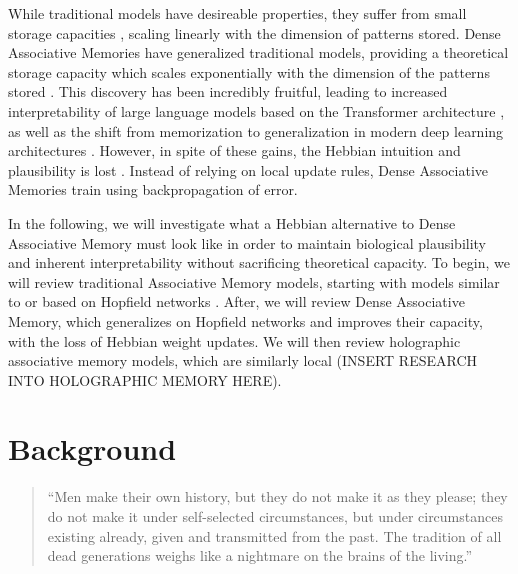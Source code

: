 \documentclass{article}
\theoremstyle{definition}
\begin{document}
While traditional models have desireable properties, they suffer from small
storage capacities \parencites{hopfield_neural_1982,amit_storing_1985},
scaling linearly with the dimension of patterns stored. Dense
Associative Memories have generalized traditional models, providing a
theoretical
storage capacity which scales exponentially with the dimension of the patterns
stored \parencites{krotov_dense_2016,demircigil_model_2017}. This discovery
has been incredibly fruitful, leading to increased interpretability of
large language models based on the Transformer architecture
\parencites{vaswani_attention_2023,ramsauer_hopfield_2021}, as well as the shift
from memorization to generalization in modern deep learning architectures
\parencite{pham_memorization_2025}. However, in spite of these gains,
the Hebbian
intuition and plausibility is lost \parencite{mcalister_sequential_2025}.
Instead of relying on local update rules, Dense Associative Memories
train using backpropagation of error.

In the following, we will investigate what a Hebbian alternative to Dense
Associative Memory must look like in order to maintain biological plausibility
and inherent interpretability without sacrificing theoretical
capacity. To begin,
we will review traditional Associative Memory models, starting with
models similar to or based on Hopfield networks
\parencite{hopfield_neural_1982}.
After, we will review Dense Associative Memory, which generalizes on Hopfield
networks and improves their capacity, with the loss of Hebbian weight updates.
We will then review holographic associative memory models, which are
similarly local (INSERT RESEARCH INTO HOLOGRAPHIC MEMORY HERE).

\section{Background}

\begin{quote}
  ``Men make their own history, but they do not make it as they please; they
  do not make it under self-selected circumstances, but under circumstances
  existing already, given and transmitted from the past. The tradition of all
  dead generations weighs like a nightmare on the brains of the living.''
  \parencite{marx_eighteenth_1852}
\end{quote}
\end{document}
